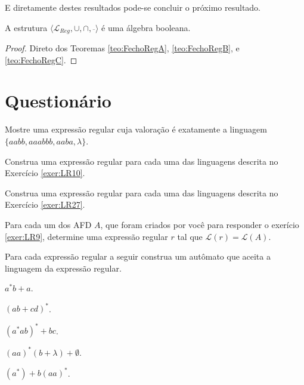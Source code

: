 E diretamente destes resultados pode-se concluir o próximo resultado.

\begin{corolario}
	A estrutura $\langle \mathcal{L}_{Reg}, \cup, \cap, \overline{ \ } \rangle$ é uma álgebra booleana.
\end{corolario}

\begin{proof}
	Direto dos Teoremas \ref{teo:FechoRegA}, \ref{teo:FechoRegB}, e \ref{teo:FechoRegC}.
\end{proof}



\section{Questionário}\label{sec:Questionario3part4}


\begin{questao}\label{exer:EGR35}
	Mostre uma expressão regular cuja valoração é exatamente a linguagem $\{aabb, aaabbb, aaba, \lambda\}$. 
\end{questao}

\begin{questao}\label{exer:EGR36}
	Construa uma expressão regular para cada uma das linguagens descrita no Exercício \ref{exer:LR10}.
\end{questao}

\begin{questao}\label{exer:EGR37}
	Construa uma expressão regular para cada uma das linguagens descrita no Exercício \ref{exer:LR27}.
\end{questao}

\begin{questao}\label{exer:EGR38}
	Para cada um dos AFD $A$, que foram criados por você para responder o exerício \ref{exer:LR9}, determine uma expressão regular $r$ tal que $\mathcal{L}(r) = \mathcal{L}(A)$.
\end{questao}

\begin{questao}\label{exer:EGR39}
	Para cada expressão regular a seguir construa um autômato que aceita a linguagem da expressão regular.
\end{questao}

\begin{exerList}
	\item $a^*b + a$.
	\item $(ab + cd)^*$.
	\item $(a^*ab)^* + bc$.
	\item $(aa)^* (b + \lambda) + \emptyset$.
	\item $(a^*) + b(aa)^*$.
\end{exerList}

